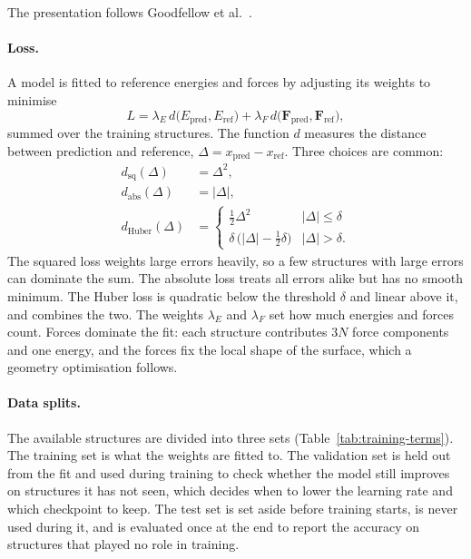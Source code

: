 The presentation follows Goodfellow et al.~\cite{goodfellow2016}.

\paragraph{Loss.} A model is fitted to reference energies and forces by
adjusting its weights to minimise
%
\begin{equation}
  L = \lambda_E \, d\big(E_\text{pred}, E_\text{ref}\big)
    + \lambda_F \, d\big(\mathbf{F}_\text{pred}, \mathbf{F}_\text{ref}\big),
\end{equation}
%
summed over the training structures. The function $d$ measures the
distance between prediction and reference,
$\Delta = x_\text{pred} - x_\text{ref}$. Three choices are common:
%
\begin{align}
  d_\text{sq}(\Delta)  &= \Delta^2, \\
  d_\text{abs}(\Delta) &= |\Delta|, \\
  d_\text{Huber}(\Delta) &=
  \begin{cases}
    \tfrac{1}{2}\Delta^2 & |\Delta| \le \delta \\
    \delta\,\big(|\Delta| - \tfrac{1}{2}\delta\big) & |\Delta| > \delta .
  \end{cases}
\end{align}
%
The squared loss weights large errors heavily, so a few structures with
large errors can dominate the sum. The absolute loss treats all errors
alike but has no smooth minimum. The Huber loss is quadratic below the
threshold $\delta$ and linear above it, and combines the two. The
weights $\lambda_E$ and $\lambda_F$ set how much energies and forces
count. Forces dominate the fit: each structure contributes $3N$ force
components and one energy, and the forces fix the local shape of the
surface, which a geometry optimisation follows.

\paragraph{Data splits.} The available structures are divided into three
sets (Table~\ref{tab:training-terms}). The training set is what the
weights are fitted to. The validation set is held out from the fit and
used during training to check whether the model still improves on
structures it has not seen, which decides when to lower the learning rate
and which checkpoint to keep. The test set is set aside before training
starts, is never used during it, and is evaluated once at the end to
report the accuracy on structures that played no role in training.

